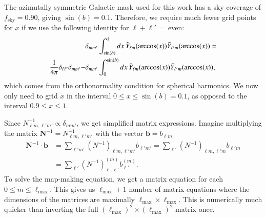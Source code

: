 \documentclass[twocolumn]{../common/aa}
\begin{document}
The azimutally symmetric Galactic mask used for this work has a sky coverage of $f_{\mathrm{sky}} = 0.90$, giving $\sin(b) = 0.1$. Therefore, we require much fewer grid points for $x$ if we use the following identity for $\ell+\ell' = $ even:
\begin{align}
&\delta_{mm'} \int_{\sin(b)}^{1} dx \, \Tilde{Y}_{\ell m}(\arccos(x)) \Tilde{Y}_{\ell' m}(\arccos(x)) = \\
\frac{1}{4\pi}\delta_{\ell \ell'}\delta_{m m'} - &\delta_{mm'} \int_{0}^{\sin(b)} dx \, \Tilde{Y}_{\ell m}(\arccos(x)) \Tilde{Y}_{\ell' m}(\arccos(x)),
\end{align}
which comes from the orthonormality condition for spherical harmonics. We now only need to grid $x$ in the interval $0\leq x \leq \sin(b) = 0.1$, as opposed to the interval $0.9 \leq x \leq 1$.

Since $N^{-1}_{\ell m, \ell' m'} \propto \delta_{m m'}$, we get simplified matrix expressions. Imagine multiplying the matrix $\textbf{N}^{-1} = N^{-1}_{\ell m, \ell' m'}$ with the vector $\textbf{b} = b_{\ell m}$
\begin{align}
\textbf{N}^{-1} \cdot \textbf{b} &= \sum_{\ell' m'}\left(N^{-1}\right)_{\ell m, \ell' m'}b_{\ell' m'} = \sum_{\ell'}\left(N^{-1}\right)_{\ell m, \ell' m}b_{\ell' m}\\
&= \sum_{\ell' }\left(N^{-1}\right)^{(m)}_{\ell, \ell'}b^{(m)}_{\ell'}.
\end{align}
To solve the map-making equation, we get a matrix equation for each $0 \leq m \leq \ell_{\mathrm{max}}$. This gives us $\ell_{\textrm{max}}+1$ number of matrix equations where the dimensions of the matrices are maximally $\ell_{\textrm{max}} \times \ell_{\textrm{max}}$. This is numerically much quicker than inverting the full $(\ell_{\textrm{max}})^2 \times (\ell_{\textrm{max}})^2$ matrix once.
\end{document}
